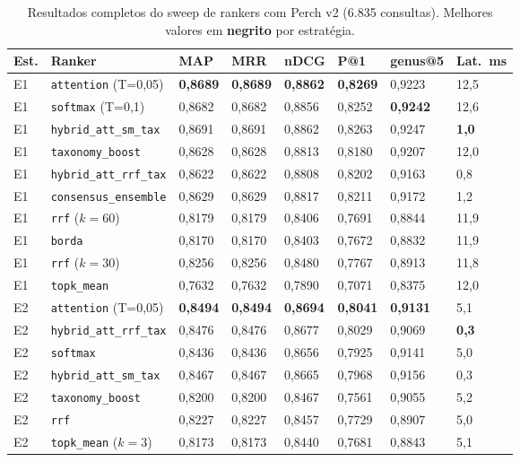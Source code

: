 \documentclass[12pt,a4paper]{article}
\begin{document}
\begin{table}[htbp]
\centering
\caption{Resultados completos do sweep de rankers com Perch v2 (6.835 consultas).
Melhores valores em \textbf{negrito} por estratégia.}
\label{tab:sweep_perch_full}
\begin{tabular}{L{1.0cm}L{3.5cm}C{1.3cm}C{1.3cm}C{1.3cm}C{1.2cm}C{1.3cm}C{1.3cm}}
\toprule
\textbf{Est.} & \textbf{Ranker} & \textbf{MAP} & \textbf{MRR} & \textbf{nDCG} & \textbf{P@1} & \textbf{genus@5} & \textbf{Lat.\ ms} \\
\midrule
E1 & \texttt{attention} (T=0,05) & \textbf{0,8689} & \textbf{0,8689} & \textbf{0,8862} & \textbf{0,8269} & 0,9223 & 12,5 \\
E1 & \texttt{softmax} (T=0,1) & 0,8682 & 0,8682 & 0,8856 & 0,8252 & \textbf{0,9242} & 12,6 \\
E1 & \texttt{hybrid\_att\_sm\_tax} & 0,8691 & 0,8691 & 0,8862 & 0,8263 & 0,9247 & \textbf{1,0} \\
E1 & \texttt{taxonomy\_boost} & 0,8628 & 0,8628 & 0,8813 & 0,8180 & 0,9207 & 12,0 \\
E1 & \texttt{hybrid\_att\_rrf\_tax} & 0,8622 & 0,8622 & 0,8808 & 0,8202 & 0,9163 & 0,8 \\
E1 & \texttt{consensus\_ensemble} & 0,8629 & 0,8629 & 0,8817 & 0,8211 & 0,9172 & 1,2 \\
E1 & \texttt{rrf} ($k=60$) & 0,8179 & 0,8179 & 0,8406 & 0,7691 & 0,8844 & 11,9 \\
E1 & \texttt{borda} & 0,8170 & 0,8170 & 0,8403 & 0,7672 & 0,8832 & 11,9 \\
E1 & \texttt{rrf} ($k=30$) & 0,8256 & 0,8256 & 0,8480 & 0,7767 & 0,8913 & 11,8 \\
E1 & \texttt{topk\_mean} & 0,7632 & 0,7632 & 0,7890 & 0,7071 & 0,8375 & 12,0 \\
\midrule
E2 & \texttt{attention} (T=0,05) & \textbf{0,8494} & \textbf{0,8494} & \textbf{0,8694} & \textbf{0,8041} & \textbf{0,9131} & 5,1 \\
E2 & \texttt{hybrid\_att\_rrf\_tax} & 0,8476 & 0,8476 & 0,8677 & 0,8029 & 0,9069 & \textbf{0,3} \\
E2 & \texttt{softmax} & 0,8436 & 0,8436 & 0,8656 & 0,7925 & 0,9141 & 5,0 \\
E2 & \texttt{hybrid\_att\_sm\_tax} & 0,8467 & 0,8467 & 0,8665 & 0,7968 & 0,9156 & 0,3 \\
E2 & \texttt{taxonomy\_boost} & 0,8200 & 0,8200 & 0,8467 & 0,7561 & 0,9055 & 5,2 \\
E2 & \texttt{rrf} & 0,8227 & 0,8227 & 0,8457 & 0,7729 & 0,8907 & 5,0 \\
E2 & \texttt{topk\_mean} ($k=3$) & 0,8173 & 0,8173 & 0,8440 & 0,7681 & 0,8843 & 5,1 \\
\bottomrule
\end{tabular}
\end{table}
\end{document}
